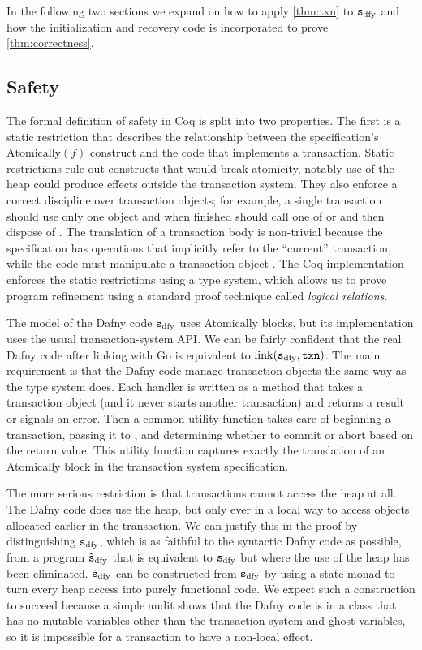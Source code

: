 In the following two sections we expand on how to apply \cref{thm:txn} to
$\texttt{s}_{\mathrm{dfy}}$ and how the initialization and recovery code is incorporated to prove
\cref{thm:correctness}.

\subsection{Safety}

The formal definition of safety in Coq is split into two properties. The first
is a static restriction that describes the
relationship between the specification's $\mathrm{Atomically}(f)$ construct and
the code that implements a transaction. Static restrictions rule out constructs
that would break atomicity, notably use of the heap could produce effects
outside the transaction system. They also enforce a correct discipline over
transaction objects; for example, a single transaction should use only one
 object and when finished should call one of  or 
and then dispose of . The translation of a transaction body is
non-trivial because the specification has operations that implicitly refer to
the ``current'' transaction, while the code must manipulate a transaction object
. The Coq implementation enforces the static restrictions using a type
system, which allows us to prove program refinement
using a standard proof technique called \emph{logical relations}.

The model of the Dafny code $\texttt{s}_{\mathrm{dfy}}$ uses Atomically blocks, but its
implementation uses the usual transaction-system API\@. We can be fairly confident
that the real Dafny code after linking with Go is equivalent to $\mathrm{link}(\texttt{s}_{\mathrm{dfy}}, \texttt{txn})$.
The main requirement is that the Dafny code manage transaction objects the same
way as the type system does. Each handler is written as a method that takes a
transaction object (and it never starts another transaction) and returns a
result or signals an error. Then a common utility function  takes
care of beginning a transaction, passing it to , and determining whether
to commit or abort based on the return value. This utility function captures
exactly the translation of an Atomically block in the transaction system specification.

The more serious restriction is that transactions cannot access the heap at all.
The Dafny code does use the heap, but only ever in a local way to access objects
allocated earlier in the transaction. We can justify this in the proof by
distinguishing $\texttt{s}_{\mathrm{dfy}}$, which is as faithful to the syntactic Dafny code as
possible, from a program $\tilde{\texttt{s}}_{\mathrm{dfy}}$ that is equivalent to $\texttt{s}_{\mathrm{dfy}}$ but where the
use of the heap has been eliminated. $\tilde{\texttt{s}}_{\mathrm{dfy}}$ can be constructed from $\texttt{s}_{\mathrm{dfy}}$
by using a state monad to turn every heap access into purely functional code.
We expect such a construction to succeed because
a simple audit shows that the Dafny code is in a class that has no mutable
variables other than the transaction system and ghost variables,
so it is impossible for a transaction to have a non-local effect.

